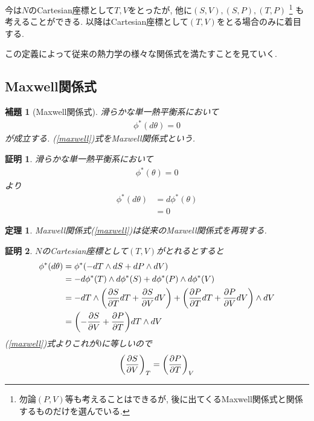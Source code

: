 \documentclass[a4paper,12pt]{ltjsarticle}
\theoremstyle{break}
\newtheorem{thrm}[thm]{定理}
\newtheorem{lem}[thm]{補題}
\newtheorem*{prf}{証明}
\newcommand{\ddel}[2]{\frac{\partial{#1}}{\partial{#2}}}
\numberwithin{equation}{section}
\begin{document}
今は$N$のCartesian座標として$T,V$をとったが, 他に$(S,V), (S,P), (T,P)$ 
\footnote{
  勿論$(P,V)$等も考えることはできるが, 後に出てくるMaxwell関係式と関係するものだけを選んでいる. 
}
も考えることができる. 
以降はCartesian座標として$(T,V)$をとる場合のみに着目する.

この定義によって従来の熱力学の様々な関係式を満たすことを見ていく. 

\subsection{Maxwell関係式}

\begin{lem}[Maxwell関係式]
  滑らかな単一熱平衡系において
  \begin{align}
    \label{maxwell}
    \phi^*(d\theta)
    = 0
  \end{align}
  が成立する.  
  (\ref{maxwell})式をMaxwell関係式という.
\end{lem}  

\begin{prf}
  滑らかな単一熱平衡系において
  \begin{align*}
    \phi^*(\theta)
    = 0
  \end{align*}
  より
  \begin{align*}
    \phi^*(d\theta) 
    &= d \phi^*(\theta) \\
    &= 0
  \end{align*}
\end{prf}

\begin{thrm}
  Maxwell関係式(\ref{maxwell})は従来のMaxwell関係式を再現する. 
\end{thrm}

\begin{prf}
  $N$のCartesian座標として$(T,V)$がとれるとすると
  \begin{align*}
    \phi^*(d\theta) 
    &= \phi^*(-dT \wedge dS + dP \wedge dV) \\
    &= -d\phi^*(T) \wedge d\phi^*(S) + d\phi^*(P) \wedge d\phi^*(V) \\
    &= -dT \wedge \qty(\ddel{S}{T} dT + \ddel{S}{V} dV) + \qty(\ddel{P}{T} dT + \ddel{P}{V} dV) \wedge dV \\
    &= \qty(-\ddel{S}{V} + \ddel{P}{T}) dT \wedge dV \\
  \end{align*}
  (\ref{maxwell})式よりこれが$0$に等しいので
  \begin{align}
    \label{maxwell1}
    \qty(\ddel{S}{V})_T 
    = \qty(\ddel{P}{T})_V
  \end{align}
\end{prf}
\end{document}
